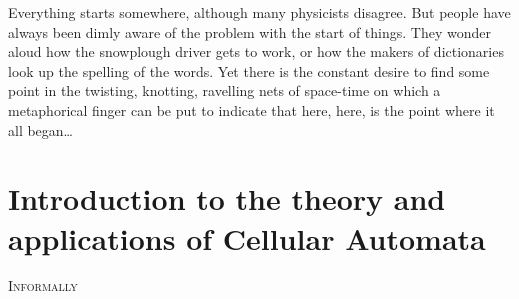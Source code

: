 
\begin{savequote}[99mm]
Everything starts somewhere, although many physicists disagree. But people have always been dimly aware of the problem with the start of things. They wonder aloud how the snowplough driver gets to work, or how the makers of dictionaries look up the spelling of the words. Yet there is the constant desire to find some point in the twisting, knotting, ravelling nets of space-time on which a metaphorical finger can be put to indicate that here, here, is the point where it all began\ldots
{}
\end{savequote}

\chapter{Introduction to the theory and applications of Cellular Automata}\label{chap:intro}

\lettrine[lines=5, loversize=-0.1, lraise=0.1]{I}{nformally}

